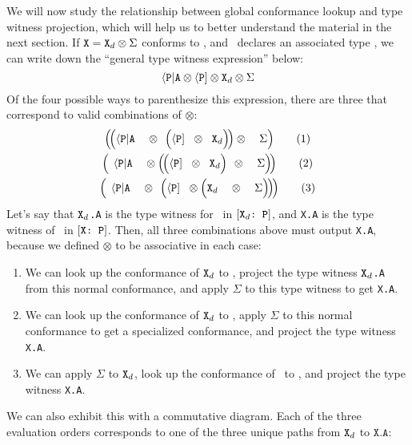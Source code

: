 \documentclass[../generics]{subfiles}
\begin{document}
We will now study the relationship between global conformance lookup and type witness projection, which will help us to better understand the material in the next section. If $\texttt{X}=\texttt{X}_d\otimes\Sigma$ conforms to \tP, and \tP\ declares an associated type \nA, we can write down the ``general type witness expression'' below:
\[\langle\texttt{P}|\texttt{A}\otimes\langle\texttt{P}]\otimes\texttt{X}_d\otimes\Sigma\]
Of the four possible ways to parenthesize this expression, there are three that correspond to valid combinations of $\otimes$:
\newcommand{\PB}{\phantom{\Big(}}
\newcommand{\PBB}{\phantom{\Big(\!\Big(}}
\begin{gather*}
\Big(\!\Big( \APA \PBB \otimes \PB\!\Big( \PP \PB \otimes \PB \tXd \Big)\!\Big) \otimes \PBB \Sigma \Big) \tag{1}\\
\Big(\!\PB \APA \PBB \otimes \Big(\!\Big(\PP \PB \otimes \PB \tXd \Big)\!\PB \otimes \PBB \Sigma \Big)\!\Big) \tag{2}\\
\Big(\!\PB \APA \PBB \otimes \PB\! \Big( \PP \PB \otimes \Big( \tXd \PBB \otimes \PBB \Sigma \Big)\!\Big)\!\Big) \tag{3}
\end{gather*}
Let's say that \texttt{$\texttt{X}_d$.A} is the type witness for \nA\ in $[\texttt{$\texttt{X}_d$:~P}]$, and \texttt{X.A} is the type witness of \nA\ in $[\texttt{X:~P}]$. Then, all three combinations above must output \texttt{X.A}, because we defined $\otimes$ to be associative in each case:
\begin{enumerate}
\item We can look up the conformance of $\texttt{X}_d$ to \tP, project the type witness \texttt{$\texttt{X}_d$.A} from this normal conformance, and apply $\Sigma$ to this type witness to get \texttt{X.A}.
\item We can look up the conformance of $\texttt{X}_d$ to \tP, apply $\Sigma$ to this normal conformance to get a specialized conformance, and project the type witness \texttt{X.A}.
\item We can apply $\Sigma$ to $\texttt{X}_d$, look up the conformance of \tX\ to \tP, and project the type witness \texttt{X.A}.
\end{enumerate}
We can also exhibit this with a commutative diagram. Each of the three evaluation orders corresponds to one of the three unique paths from $\texttt{X}_d$ to $\texttt{X.A}$:
\begin{center}
\end{center}
\end{document}
